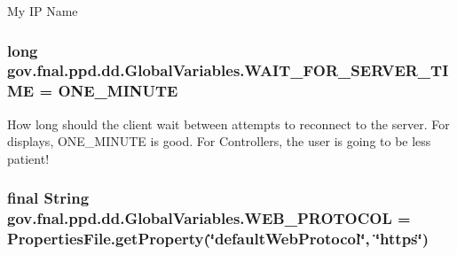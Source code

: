My I\-P Name \hypertarget{classgov_1_1fnal_1_1ppd_1_1dd_1_1GlobalVariables_ab1fa16703a549d62b7ceaf50f6beb881}{
\subsubsection[{W\-A\-I\-T\-\_\-\-F\-O\-R\-\_\-\-S\-E\-R\-V\-E\-R\-\_\-\-T\-I\-M\-E}]{\setlength{\rightskip}{0pt plus 5cm}long gov.\-fnal.\-ppd.\-dd.\-Global\-Variables.\-W\-A\-I\-T\-\_\-\-F\-O\-R\-\_\-\-S\-E\-R\-V\-E\-R\-\_\-\-T\-I\-M\-E = {\bf O\-N\-E\-\_\-\-M\-I\-N\-U\-T\-E}\hspace{0.3cm}{\ttfamily [static]}}}\label{classgov_1_1fnal_1_1ppd_1_1dd_1_1GlobalVariables_ab1fa16703a549d62b7ceaf50f6beb881}
How long should the client wait between attempts to reconnect to the server. For displays, O\-N\-E\-\_\-\-M\-I\-N\-U\-T\-E is good. For Controllers, the user is going to be less patient! \hypertarget{classgov_1_1fnal_1_1ppd_1_1dd_1_1GlobalVariables_aa3bf05d555f0c3489c60664ae54a2480}{
\subsubsection[{W\-E\-B\-\_\-\-P\-R\-O\-T\-O\-C\-O\-L}]{\setlength{\rightskip}{0pt plus 5cm}final String gov.\-fnal.\-ppd.\-dd.\-Global\-Variables.\-W\-E\-B\-\_\-\-P\-R\-O\-T\-O\-C\-O\-L = Properties\-File.\-get\-Property(\char`\"{}default\-Web\-Protocol\char`\"{}, \char`\"{}https\char`\"{})\hspace{0.3cm}{\ttfamily [static]}}}\label{classgov_1_1fnal_1_1ppd_1_1dd_1_1GlobalVariables_aa3bf05d555f0c3489c60664ae54a2480}
